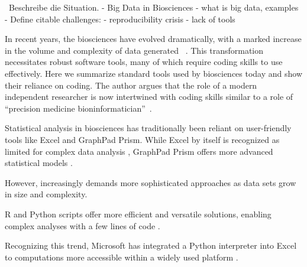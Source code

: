

\
Beschreibe die Situation.
- Big Data in Biosciences
- what is big data, examples
- Define citable challenges:
    - reproducibility crisis
    - lack of tools




In recent years, the biosciences have evolved dramatically, with a marked
increase in the volume and complexity of data generated
~\cite{yangScalabilityValidationBig2017,ekmekciIntroductionProgrammingBioscientists2016}.
This transformation necessitates robust software tools, many of which require
coding skills to use effectively. Here we summarize standard tools used by
biosciences today and show their reliance on coding. The author argues that the
role of a modern independent researcher is now intertwined with coding skills
similar to a role of ``precision medicine
bioninformatician''~\cite{gomez-lopezPrecisionMedicineNeeds2019}.

Statistical analysis in biosciences has traditionally been reliant on
user-friendly tools like Excel and GraphPad Prism. While Excel by itself is
recognized as limited for complex data analysis
\cite{tanavaleeLimitationsUsingMicrosoft2016a, incertiYouStillUsing2019a},
GraphPad Prism offers more advanced statistical models .

However, increasingly demands more sophisticated
approaches as data sets grow in size and complexity.

R and Python scripts offer more efficient and
versatile solutions, enabling complex analyses with a few lines of code
\cite{rcoreteamLanguageEnvironmentStatistical2018,vallatPingouinStatisticsPython2018}.

Recognizing this trend, Microsoft has integrated a Python interpreter into Excel to
computations more accessible within a widely used platform \cite{AnnouncingPythonExcel2023}.


